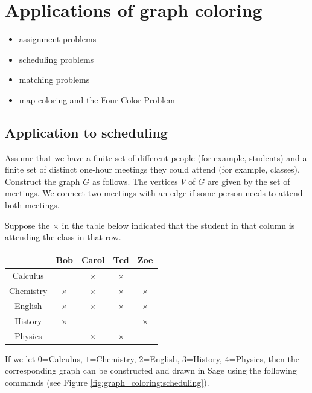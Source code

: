

\section{Applications of graph coloring}

\begin{itemize}
\item assignment problems

\item scheduling problems

\item matching problems

\item map coloring and the Four Color Problem
\end{itemize}


\subsection{Application to scheduling}

Assume that we have a finite set of different people (for example, students)
and a finite set of distinct one-hour meetings they could attend (for example,
classes). Construct the
graph $G$ as follows. The vertices $V$ of $G$ are given by the set of
meetings. We connect two meetings with an edge if some person
needs to attend both meetings.

\begin{example}
\label{eg:coloring}
Suppose the $\times$ in the table below
indicated that the student in that column is attending the class in that
row.

\begin{center}
\begin{tabular}{c|cccc}
                  &  Bob            &  Carol         &       Ted      &    Zoe   \\ \hline
Calculus          &                 &    $\times$   &  $\times$      &           \\
Chemistry        &    $\times$     &   $\times$   &    $\times$   &    $\times$   \\
English            &    $\times$     &   $\times$   &    $\times$   &    $\times$   \\
History          &    $\times$     &              &             &    $\times$     \\
Physics          &                    &    $\times$  &    $\times$    &    \\  \hline

\end{tabular}
\end{center}

If we let $0$=Calculus, $1$=Chemistry, $2$=English,
$3$=History, $4$=Physics, then the corresponding graph can be
constructed and drawn in Sage using the following commands
(see Figure \ref{fig:graph_coloring:scheduling}).
\end{example}

